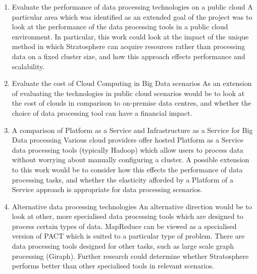 \begin{enumerate}

\item Evaluate the performance of data processing technologies on a public cloud
A particular area which was identified as an extended goal of the project was to look at the performance of the data processing tools in a public cloud environment. In particular, this work could look at the impact of the unique method in which Stratosphere can acquire resources rather than processing data on a fixed cluster size, and how this approach effects performance and scalability. 

\item Evaluate the cost of Cloud Computing in Big Data scenarios
As an extension of evaluating the technologies in public cloud scenarios would be to look at the cost of clouds in comparison to on-premise data centres, and whether the choice of data processing tool can have a financial impact.

\item A comparison of Platform as a Service and Infrastructure as a Service for Big Data processing
Various cloud providers offer hosted Platform as a Service data processing tools (typically Hadoop) which allow users to process data without worrying about manually configuring a cluster. A possible extension to this work would be to consider how this effects the performance of data processing tasks, and whether the elasticity afforded by a Platform of a Service approach is appropriate for data processing scenarios. 

\item Alternative data processing technologies
An alternative direction would be to look at other, more specialised data processing tools which are designed to process certain types of data. MapReduce can be viewed as a specialised version of PACT which is suited to a particular type of problem. There are data processing tools designed for other tasks, such as large scale graph processing (Giraph). Further research could determine whether Stratosphere performs better than other specialised tools in relevant scenarios.
\end{enumerate}

